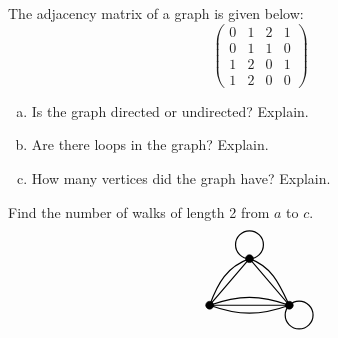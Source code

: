 \documentclass[11pt,letterpaper]{article}
\begin{document}
\newpage



 The adjacency matrix of a graph is given below:
	\[
	\begin{pmatrix}
	0 & 1 & 2 & 1 \\
	0 & 1 & 1 & 0 \\
	1 & 2 & 0 & 1 \\
	1 & 2 & 0 & 0 
	\end{pmatrix}
	\]

\begin{enumerate}[(a)]
\item Is the graph directed or undirected? Explain. 
\item Are there loops in the graph? Explain. 
\item How many vertices did the graph have? Explain. 
\end{enumerate}



\newpage



 Find the number of walks of length 2 from $a$ to $c$. 
	\[
	\begin{tikzpicture}
	\draw[line width=0.03cm] (0,0) -- (2,0) -- (1,1.1732) -- (0,0);
	\draw[line width=0.03cm] (0,0) to[out= -20,in= -160] (2,0);
	\draw[line width=0.03cm] (2,0) to[out= 115,in= -20] (1,1.1732);
	\draw[line width=0.03cm] (1,1.1732) to[out= 200,in= 70] (0,0);
	\draw[line width=0.03cm] (0,0) to[out= 20,in= 160] (2,0);
	\draw[line width=0.03cm] (1,1.5232) circle (0.35);
	\draw[line width=0.03cm] (2.247,-0.247) circle (0.35);

	\draw[fill=black] (0,0) circle (0.1);
	\draw[fill=black] (1,1.1732) circle (0.1);
	\draw[fill=black] (2,0) circle (0.1);
	\end{tikzpicture}
	\]
\end{document}
